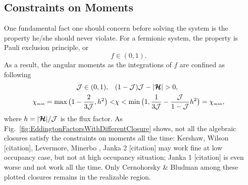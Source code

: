 \subsection{Constraints on Moments}
One fundamental fact one should concern before solving the system is the property he/she should never violate.
For a fermionic system, the property is Pauli exclusion principle, or 
\begin{equation}
f \in (0,1).
\end{equation}
As a result, the angular moments as the integrations of $f$ are confined as following
\begin{align}
\mathcal{J} \in(0,1), \quad &(1-\mathcal{J})\mathcal{J}-|\boldsymbol{\mathcal{H}}|  > 0, \\
  \chi_{\mbox{\tiny min}}
  =\max\big(1-\frac{2}{3\mathcal{J}},h^{2}\big)
  < & \chi<\min\big(1,\frac{1}{3\mathcal{J}}-\frac{\mathcal{J}}{1-\mathcal{J}}h^{2}\big)=\chi_{\mbox{\tiny max}},
  \label{eq:eddingtonFactorBounds}
\end{align}
where $h = |\boldsymbol{\mathcal{H}}|/\mathcal{J}$ is the flux factor.
As Fig.~\eqref{fig:EddingtonFactorsWithDifferentClosure} shows, not all the algebraic closures satisfy the constraints on moments all the time: Kershaw\cite{kershaw_1976}, Wilson [citation], Levermore\cite{levermore_1984}, Minerbo \cite{minerbo_1978}, Janka 2 [citation] may work fine at low occupancy case, but not at high occupancy situation; Janka 1 [citation] is even worse and not work all the time. Only Cernohorsky \& Bludman\cite{cernohorskyBludman_1994} among these plotted closures remains in the realizable region.
